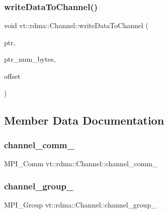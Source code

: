 \subsubsection{\texorpdfstring{write\+Data\+To\+Channel()}{writeDataToChannel()}}
{\footnotesize\ttfamily void vt\+::rdma\+::\+Channel\+::write\+Data\+To\+Channel (\begin{DoxyParamCaption}\item[{\hyperlink{namespacevt_a9e2c953286c7616f7c218e9951790776}{R\+D\+M\+A\+\_\+\+Ptr\+Type} const \&}]{ptr,  }\item[{\hyperlink{namespacevt_aab8d55968084610ce3b17057981e9300}{Byte\+Type} const \&}]{ptr\+\_\+num\+\_\+bytes,  }\item[{\hyperlink{namespacevt_aab8d55968084610ce3b17057981e9300}{Byte\+Type} const \&}]{offset }\end{DoxyParamCaption})}



\subsection{Member Data Documentation}
\mbox{\label{structvt_1_1rdma_1_1_channel_aded72d4b1d8e8ed23b4e384b96b99c67}} 
\subsubsection{\texorpdfstring{channel\+\_\+comm\+\_\+}{channel\_comm\_}}
{\footnotesize\ttfamily M\+P\+I\+\_\+\+Comm vt\+::rdma\+::\+Channel\+::channel\+\_\+comm\+\_\+\hspace{0.3cm}{\ttfamily [private]}}

\mbox{\label{structvt_1_1rdma_1_1_channel_af4a0e2ef3352ae60e61601d65e120ab9}} 
\subsubsection{\texorpdfstring{channel\+\_\+group\+\_\+}{channel\_group\_}}
{\footnotesize\ttfamily M\+P\+I\+\_\+\+Group vt\+::rdma\+::\+Channel\+::channel\+\_\+group\+\_\+\hspace{0.3cm}{\ttfamily [private]}}

